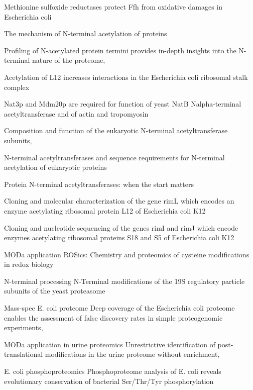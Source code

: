 \documentclass[12pt]{article}
\begin{document}
\cite{Ezratyetal2004}
{Methionine sulfoxide reductases protect Ffh from oxidative damages in Escherichia coli}

\cite{Driessenetal1985}
{The mechanism of N-terminal acetylation of proteins}

\cite{Helbigetal2010}
{Profiling of N-acetylated protein termini provides in-depth insights into the N-terminal nature of the proteome},

\cite{Gordiyenkoetal2008}
 {Acetylation of L12 increases interactions in the Escherichia coli ribosomal stalk complex}
 
\cite{Polevodaetal2003}
{Nat3p and Mdm20p are required for function of yeast NatB Nalpha-terminal acetyltransferase and of actin and tropomyosin}
   
\cite{PolevodaSherman2003}
{Composition and function of the eukaryotic N-terminal acetyltransferase subunits},
   
\cite{PolevodaSherman2003b}
{N-terminal acetyltransferases and sequence requirements for N-terminal acetylation of eukaryotic proteins}

\cite{Starheimetal2012}
{Protein N-terminal acetyltransferases: when the start matters}

\cite{Tanakaetal1989}
{Cloning and molecular characterization of the gene rimL which encodes an enzyme acetylating ribosomal protein L12 of Escherichia coli K12}

\cite{Yoshikawaetal1987}
{Cloning and nucleotide sequencing of the genes rimI and rimJ which encode enzymes acetylating ribosomal proteins S18 and S5 of Escherichia coli K12}
   
MODa application \cite{Kimetal2014}
{ROSics: Chemistry and proteomics of cysteine modifications in redox biology}

N-terminal processing \cite{Kimuraetal2003}
{N-Terminal modifications of the 19S regulatory particle subunits of the yeast proteasome}

Mass-spec E. coli proteome \cite{Krugetal2013}
{Deep coverage of the Escherichia coli proteome enables the assessment of false discovery rates in simple proteogenomic experiments},

MODa application in urine proteomics \cite{Liuetal2013}
{Unrestrictive identification of post-translational modifications in the urine proteome without enrichment},

E. coli phosphoproteomics \cite{Maceketal2008}
{Phosphoproteome analysis of E. coli reveals evolutionary conservation of bacterial Ser/Thr/Tyr phosphorylation}
\end{document}
